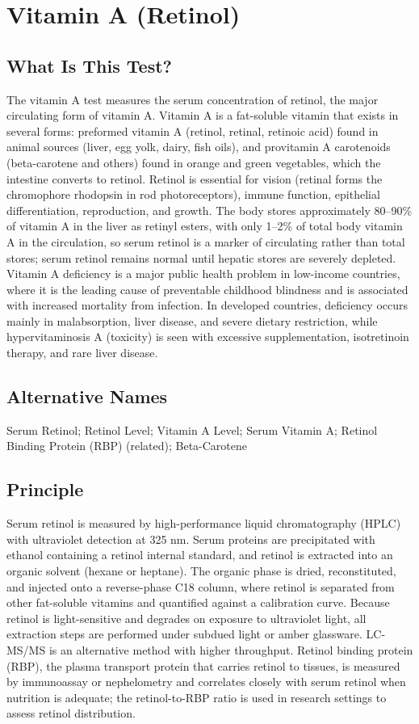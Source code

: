 \chapter{Vitamin A (Retinol)}

\section*{What Is This Test?}
The vitamin A test measures the serum concentration of retinol, the major circulating form of vitamin A. Vitamin A is a fat-soluble vitamin that exists in several forms: preformed vitamin A (retinol, retinal, retinoic acid) found in animal sources (liver, egg yolk, dairy, fish oils), and provitamin A carotenoids (beta-carotene and others) found in orange and green vegetables, which the intestine converts to retinol. Retinol is essential for vision (retinal forms the chromophore rhodopsin in rod photoreceptors), immune function, epithelial differentiation, reproduction, and growth. The body stores approximately 80--90\% of vitamin A in the liver as retinyl esters, with only 1--2\% of total body vitamin A in the circulation, so serum retinol is a marker of circulating rather than total stores; serum retinol remains normal until hepatic stores are severely depleted. Vitamin A deficiency is a major public health problem in low-income countries, where it is the leading cause of preventable childhood blindness and is associated with increased mortality from infection. In developed countries, deficiency occurs mainly in malabsorption, liver disease, and severe dietary restriction, while hypervitaminosis A (toxicity) is seen with excessive supplementation, isotretinoin therapy, and rare liver disease.

\section*{Alternative Names}
Serum Retinol; Retinol Level; Vitamin A Level; Serum Vitamin A; Retinol Binding Protein (RBP) (related); Beta-Carotene

\section*{Principle}
Serum retinol is measured by high-performance liquid chromatography (HPLC) with ultraviolet detection at 325 nm. Serum proteins are precipitated with ethanol containing a retinol internal standard, and retinol is extracted into an organic solvent (hexane or heptane). The organic phase is dried, reconstituted, and injected onto a reverse-phase C18 column, where retinol is separated from other fat-soluble vitamins and quantified against a calibration curve. Because retinol is light-sensitive and degrades on exposure to ultraviolet light, all extraction steps are performed under subdued light or amber glassware. LC-MS/MS is an alternative method with higher throughput. Retinol binding protein (RBP), the plasma transport protein that carries retinol to tissues, is measured by immunoassay or nephelometry and correlates closely with serum retinol when nutrition is adequate; the retinol-to-RBP ratio is used in research settings to assess retinol distribution.

